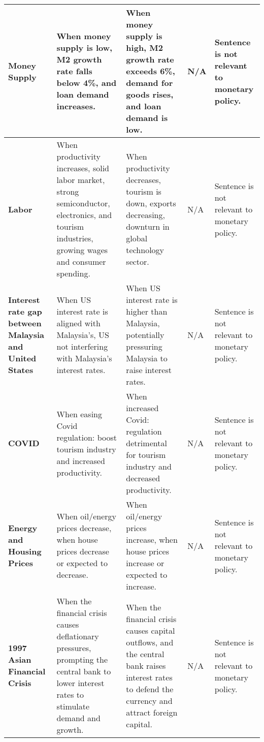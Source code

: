 \begin{longtable}{p{}p{}p{}p{}p{}}
\midrule
\textbf{Money Supply} & When money supply is low, M2 growth rate falls below 4\%, and loan demand increases. & When money supply is high, M2 growth rate exceeds 6\%, demand for goods rises, and loan demand is low. & N/A & Sentence is not relevant to monetary policy. \\
\midrule
\textbf{Labor} & When productivity increases, solid labor market, strong semiconductor, electronics, and tourism industries, growing wages and consumer spending. & When productivity decreases, tourism is down, exports decreasing, downturn in global technology sector. & N/A & Sentence is not relevant to monetary policy. \\
\midrule
\textbf{Interest rate gap between Malaysia and United States} & When US interest rate is aligned with Malaysia’s, US not interfering with Malaysia’s interest rates. & When US interest rate is higher than Malaysia, potentially pressuring Malaysia to raise interest rates. & N/A & Sentence is not relevant to monetary policy. \\
\midrule
\textbf{COVID} & When easing Covid regulation: boost tourism industry and increased productivity. & When increased Covid: regulation detrimental for tourism industry and decreased productivity. & N/A & Sentence is not relevant to monetary policy. \\
\midrule
\textbf{Energy and Housing Prices} & When oil/energy prices decrease, when house prices decrease or expected to decrease. & When oil/energy prices increase, when house prices increase or expected to increase. & N/A & Sentence is not relevant to monetary policy. \\
\midrule
\textbf{1997 Asian Financial Crisis} & When the financial crisis causes deflationary pressures, prompting the central bank to lower interest rates to stimulate demand and growth. & When the financial crisis causes capital outflows, and the central bank raises interest rates to defend the currency and attract foreign capital. & N/A & Sentence is not relevant to monetary policy. \\
\bottomrule
\end{longtable}
